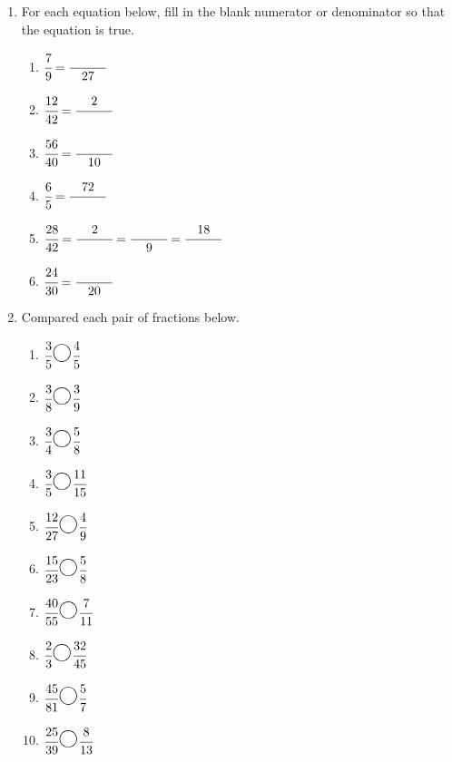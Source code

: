 \documentclass[12pt,letterpaper]{article}
\author{Shawn Ma}
\date{\today}
\begin{document}
\setlength{\parindent}{0pt}

\begin{large}
\begin{enumerate}
    \item For each equation below, fill in the blank numerator or denominator
    so that the equation is true.
    \begin{multicols}{2}
    \begin{enumerate}
        \item $\cfrac{7}{9}=\cfrac{\hspace{1cm}}{27}$
        \item $\cfrac{12}{42}=\cfrac{2}{\hspace{1cm}}$
        \item $\cfrac{56}{40}=\cfrac{\hspace{1cm}}{10}$
        \item $\cfrac{6}{5}=\cfrac{72}{\hspace{1cm}}$
        \item $\cfrac{28}{42}=\cfrac{2}{\hspace{1cm}}=\cfrac{\hspace{1cm}}{9}=\cfrac{18}{\hspace{1cm}}$
        \item $\cfrac{24}{30}=\cfrac{\hspace{1cm}}{20}$
    \end{enumerate}
\end{multicols}

    \item Compared each pair of fractions below.
    \begin{multicols}{2}
        \begin{enumerate}
            \item $\cfrac{3}{5}{\huge\Circle}\cfrac{4}{5}$
            \item $\cfrac{3}{8}{\huge\Circle}\cfrac{3}{9}$
            \item $\cfrac{3}{4}{\huge\Circle}\cfrac{5}{8}$
            \item $\cfrac{3}{5}{\huge\Circle}\cfrac{11}{15}$
            \item $\cfrac{12}{27}{\huge\Circle}\cfrac{4}{9}$
            \item $\cfrac{15}{23}{\huge\Circle}\cfrac{5}{8}$
            \item $\cfrac{40}{55}{\huge\Circle}\cfrac{7}{11}$
            \item $\cfrac{2}{3}{\huge\Circle}\cfrac{32}{45}$
            \item $\cfrac{45}{81}{\huge\Circle}\cfrac{5}{7}$
            \item $\cfrac{25}{39}{\huge\Circle}\cfrac{8}{13}$
        \end{enumerate}
    \end{multicols}


\end{enumerate}
\end{large}
\end{document}
